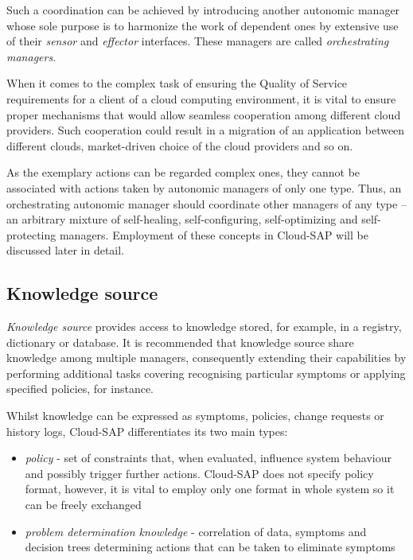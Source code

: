 Such a coordination can be achieved by introducing another autonomic manager whose sole purpose is to harmonize the work of dependent ones by extensive use of their \emph{sensor} and \emph{effector} interfaces. These managers are called \emph{orchestrating managers}.

When it comes to the complex task of ensuring the Quality of Service requirements for a client of a cloud computing environment, it is vital to ensure proper mechanisms that would allow seamless cooperation among different cloud providers. Such cooperation could result in a migration of an application between different clouds, market-driven choice of the cloud providers and so on.

As the exemplary actions can be regarded complex ones, they cannot be associated with actions taken by autonomic managers of only one type. Thus, an orchestrating autonomic manager should coordinate other managers of any type -- an arbitrary mixture of self-healing, self-configuring, self-optimizing and self-protecting managers. Employment of these concepts in Cloud-SAP will be discussed later in detail.

\subsection{Knowledge source}
\emph{Knowledge source} provides access to knowledge stored, for example, in a registry, dictionary or database. It is recommended that knowledge source share knowledge among multiple managers, consequently extending their capabilities by performing additional tasks covering recognising particular symptoms or applying specified policies, for instance.


Whilst knowledge can be expressed as symptoms, policies, change requests or history logs, Cloud-SAP differentiates its two main types:
\begin{itemize}
 \item \emph{policy} - set of constraints that, when evaluated, influence system behaviour and possibly trigger further actions. Cloud-SAP does not specify policy format, however, it is vital to employ only one format in whole system so it can be freely exchanged
 \item \emph{problem determination knowledge} - correlation of data, symptoms and decision trees determining actions that can be taken to eliminate symptoms
\end{itemize}

